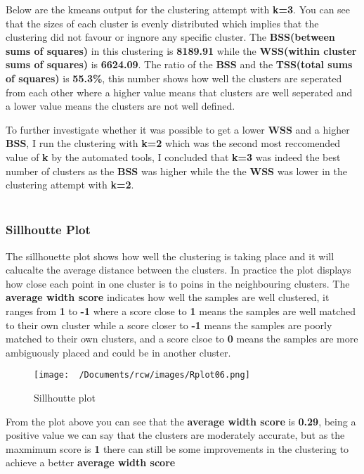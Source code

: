 \documentclass[11pt]{article}
\begin{document}
Below are the kmeans output for the clustering attempt with \textbf{k=3}. You can see that the sizes of each cluster is evenly distributed
which implies that the clustering did not favour or ingnore any specific cluster. 
The \textbf{BSS(between sums of squares)} in this clustering is \textbf{8189.91} while the \textbf{WSS(within cluster sums of squares)} is \textbf{6624.09}. 
The ratio of the \textbf{BSS} and the \textbf{TSS(total sums of squares)} is \textbf{55.3\%}, this number shows how well the clusters are seperated from each other where a higher value 
means that clusters are well seperated and a lower value means the clusters are not well defined.

To further investigate whether it was possible to get a lower \textbf{WSS} and a higher \textbf{BSS}, I run the clustering with \textbf{k=2} which was the second most reccomended value of \textbf{k} by the automated tools,
I concluded that \textbf{k=3} was indeed the best number of clusters as the \textbf{BSS} was higher while the the \textbf{WSS} was lower in the clustering attempt with \textbf{k=2}.
\\
\\


\newpage
\subsubsection{Sillhoutte Plot}

The sillhouette plot shows how well the clustering is taking place and it will calucalte the average distance between the clusters.
In practice the plot displays how close each point in one cluster is to poins in the neighbouring clusters.
The \textbf{average width score} indicates how well the samples are well clustered, it ranges from \textbf{1} to \textbf{-1} where a score close to \textbf{1} means the samples are well matched to their own cluster while 
a score closer to \textbf{-1} means the samples are poorly matched to their own clusters, and a score clsoe to \textbf{0} means the samples are more ambiguously placed and could be in another cluster.

\begin{figure}[H]
  \centering
  \texttt{[image: ~/Documents/rcw/images/Rplot06.png]}
  \caption{Sillhoutte plot}
\end{figure}

From the plot above you can see that the \textbf{average width score} is \textbf{0.29}, being a positive value we can say that the clusters are moderately accurate, but as the maxmimum score is \textbf{1} there can still be some improvements in the clustering
to achieve a better \textbf{average width score}
\end{document}
